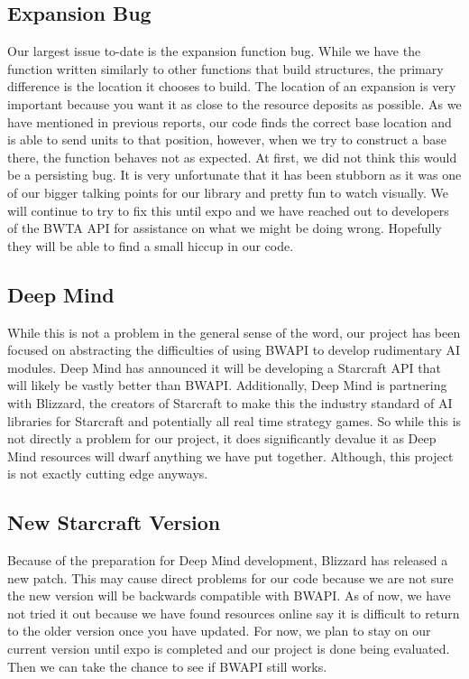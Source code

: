 \documentclass[10pt,letterpaper,onecolumn,draftclsnofoot]{IEEEtran}
\begin{document}
\subsection{Expansion Bug}
Our largest issue to-date is the expansion function bug. While we have the function written similarly to other functions that build structures, the primary difference is the location it chooses to build. The location of an expansion is very important because you want it as close to the resource deposits as possible. As we have mentioned in previous reports, our code finds the correct base location and is able to send units to that position, however, when we try to construct a base there, the function behaves not as expected. 
At first, we did not think this would be a persisting bug. It is very unfortunate that it has been stubborn as it was one of our bigger talking points for our library and pretty fun to watch visually. We will continue to try to fix this until expo and we have reached out to developers of the BWTA API for assistance on what we might be doing wrong. Hopefully they will be able to find a small hiccup in our code.
\subsection{Deep Mind}
While this is not a problem in the general sense of the word, our project has been focused on abstracting the difficulties of using BWAPI to develop rudimentary AI modules. Deep Mind has announced it will be developing a Starcraft API that will likely be vastly better than BWAPI. Additionally, Deep Mind is partnering with Blizzard, the creators of Starcraft to make this the industry standard of AI libraries for Starcraft and potentially all real time strategy games. So while this is not directly a problem for our project, it does significantly devalue it as Deep Mind resources will dwarf anything we have put together. Although, this project is not exactly cutting edge anyways. 
\subsection{New Starcraft Version}
Because of the preparation for Deep Mind development, Blizzard has released a new patch. This may cause direct problems for our code because we are not sure the new version will be backwards compatible with BWAPI. As of now, we have not tried it out because we have found resources online say it is difficult to return to the older version once you have updated. For now, we plan to stay on our current version until expo is completed and our project is done being evaluated. Then we can take the chance to see if BWAPI still works.
\end{document}
